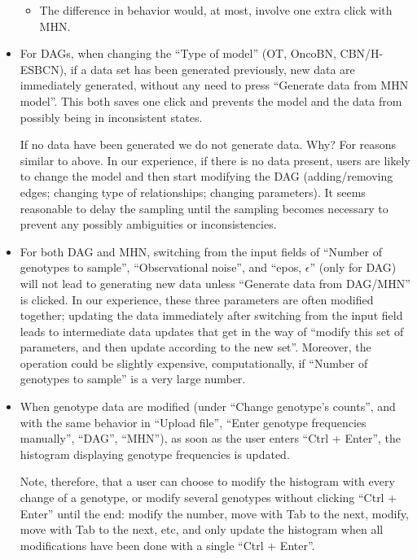 \documentclass[a4paper,11pt]{article}
\begin{document}
\begin{itemize}
\begin{itemize}
  \item The difference in behavior would, at most, involve one extra click with MHN.
  \end{itemize}


\item For DAGs, when changing the ``Type of model'' (OT, OncoBN, CBN/H-ESBCN), if a data set has been generated previously, new data are immediately generated, without any need to press ``Generate data from MHN model''. This both saves one click and prevents the model and the data from possibly being in inconsistent states.

  If no data have been generated we do not generate data. Why? For reasons similar to above. In our experience, if there is no data present, users are likely to change the model and then start modifying the DAG (adding/removing edges; changing type of relationships; changing parameters). It seems reasonable to delay the sampling until the sampling becomes necessary to prevent any possibly ambiguities or inconsistencies.

  
\item For both DAG and MHN, switching from the input fields of ``Number of genotypes to sample'', ``Observational noise'', and ``epos, $\epsilon$'' (only for DAG) will not lead to generating new data unless ``Generate data from DAG/MHN'' is clicked. In our experience, these three parameters are often modified together; updating the data immediately after switching from the input field leads to intermediate data updates that get in the way of ``modify this set of parameters, and then update according to the new set''. Moreover, the operation could be slightly expensive, computationally, if ``Number of genotypes to sample'' is a very large number.
  

\item When genotype data are modified (under ``Change genotype's counts'', and with the same behavior in ``Upload file'', ``Enter genotype frequencies manually'', ``DAG'', ``MHN''), as soon as the user enters ``Ctrl + Enter'', the histogram displaying genotype frequencies is updated.

  Note, therefore, that a user can choose to modify the histogram with every change of a genotype, or modify several genotypes without clicking ``Ctrl + Enter'' until the end: modify the number,  move with Tab to the next, modify, move with Tab to the next, etc, and only update the histogram when all modifications have been done with a single ``Ctrl + Enter''.




\end{itemize}
\end{document}
